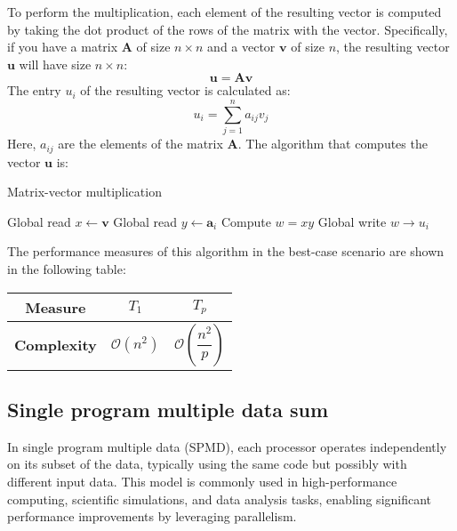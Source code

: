 To perform the multiplication, each element of the resulting vector is computed by taking the dot product of the rows of the matrix with the vector. 
Specifically, if you have a matrix $\mathbf{A}$ of size $n\times n$ and a vector $\mathbf{v}$ of size $n$, the resulting vector $\mathbf{u}$ will have size $n\times n$:
\[\mathbf{u}=\mathbf{Av}\]
The entry $u_i$ of the resulting vector is calculated as:
\[u_i=\sum_{j=1}^na_{ij}v_j\]
Here, $a_{ij}$ are the elements of the matrix $\mathbf{A}$. 
The algorithm that computes the vector $\mathbf{u}$ is:
\begin{algorithm}[H]
    \caption{Matrix-vector multiplication}
    \begin{algorithmic}[1]
        \State Global read $x \leftarrow \mathbf{v}$ 
        \State Global read $y \leftarrow \mathbf{a}_{i}$ 
        \State Compute $w = x y$ 
        \State Global write $w \rightarrow u_i$ 
    \end{algorithmic}
\end{algorithm}  
The performance measures of this algorithm in the best-case scenario are shown in the following table:
\renewcommand*{\arraystretch}{2}
\begin{table}[H]
    \centering
    \begin{tabular}{|c|cc|}
    \hline
    \textbf{Measure} & $T_1$ & $T_p$ \\ \hline
    \textbf{Complexity} & $\mathcal{O}(n^2)$ & $\mathcal{O}\left(\dfrac{n^2}{p}\right)$ \\ \hline
    \end{tabular}
\end{table}
\renewcommand*{\arraystretch}{1}

\subsection{Single program multiple data sum}
In single program multiple data (SPMD), each processor operates independently on its subset of the data, typically using the same code but possibly with different input data. 
This model is commonly used in high-performance computing, scientific simulations, and data analysis tasks, enabling significant performance improvements by leveraging parallelism. 

